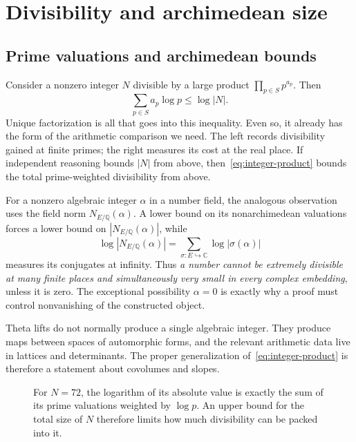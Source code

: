 \documentclass[11pt,openany,oneside]{scrbook}
\theoremstyle{definition}
\theoremstyle{remark}
\newcommand{\CC}{\mathbb C}
\newcommand{\QQ}{\mathbb Q}
\begin{document}
\chapter{Divisibility and archimedean size}\label{ch:slopes}

\section{Prime valuations and archimedean bounds}

Consider a nonzero integer $N$ divisible by a large product $\prod_{p\in S}p^{a_p}$. Then
\begin{equation}\label{eq:integer-product}
\sum_{p\in S}a_p\log p\le\log|N|.
\end{equation}
Unique factorization is all that goes into this inequality. Even so, it already has the form of the arithmetic comparison we need. The left records divisibility gained at finite primes; the right measures its cost at the real place. If independent reasoning bounds $|N|$ from above, then~\eqref{eq:integer-product} bounds the total prime-weighted divisibility from above.

For a nonzero algebraic integer $\alpha$ in a number field, the analogous observation uses the field norm $N_{E/\QQ}(\alpha)$. A lower bound on its nonarchimedean valuations forces a lower bound on $|N_{E/\QQ}(\alpha)|$, while
\begin{equation}\label{eq:fieldnorm}
\log|N_{E/\QQ}(\alpha)|
=\sum_{\sigma:E\hookrightarrow\CC}\log|\sigma(\alpha)|
\end{equation}
measures its conjugates at infinity. Thus \emph{a number cannot be extremely divisible at many finite places and simultaneously very small in every complex embedding}, unless it is zero. The exceptional possibility $\alpha=0$ is exactly why a proof must control nonvanishing of the constructed object.

Theta lifts do not normally produce a single algebraic integer. They produce maps between spaces of automorphic forms, and the relevant arithmetic data live in lattices and determinants. The proper generalization of~\eqref{eq:integer-product} is therefore a statement about covolumes and slopes.


\begin{figure}[ht]
\centering
{}
\caption{For $N=72$, the logarithm of its absolute value is exactly the sum of its prime valuations weighted by $\log p$. An upper bound for the total size of $N$ therefore limits how much divisibility can be packed into it.}
\label{fig:valuation-budget}
\end{figure}
\end{document}
